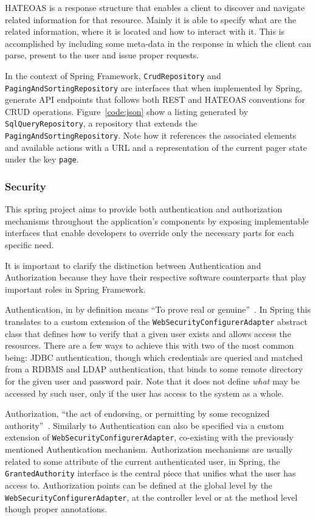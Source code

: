 \gls{HATEOAS} is a response structure that enables a client to discover and navigate related information for that resource\cite{fielding}. Mainly it is able to specify what are the related information, where it is located and how to interact with it. This is accomplished by including some meta-data in the response in which the client can parse, present to the user and issue proper requests.

In the context of Spring Framework, \texttt{CrudRepository} and \texttt{PagingAndSortingRepository} are interfaces that when implemented by Spring, generate \gls{API} endpoints that follows both \gls{REST} and \gls{HATEOAS} conventions for \gls{CRUD} operations. Figure~\ref{code:json} show a listing generated by \texttt{SqlQueryRepository}, a repository that extends the \texttt{PagingAndSortingRepository}. Note how it references the associated elements and available actions with a \gls{URL} and a representation of the current pager state under the key \texttt{page}.

\subsubsection{Security}
This spring project aims to provide both authentication and authorization mechanisms throughout the application's components by exposing implementable interfaces that enable developers to override only the necessary parts for each specific need.

It is important to clarify the distinction between Authentication and Authorization because they have their respective software counterparts that play important roles in Spring Framework.

Authentication, in by definition means ``To prove real or genuine''~\cite{merriamwebster}. In Spring this translates to a custom extension of the \texttt{WebSecurityConfigurerAdapter} abstract class that defines how to verify that a given user exists and allows access the resources. There are a few ways to achieve this with two of the most common being: \gls{JDBC} authentication, though which credentials are queried and matched from a \gls{RDBMS} and \gls{LDAP} authentication, that binds to some remote directory for the given user and password pair. Note that it does not define \textit{what} may be accessed by such user, only if the user has access to the system as a whole.

Authorization, ``the act of endorsing, or permitting by some recognized authority''~\cite{merriamwebster}. Similarly to Authentication can also be specified via a custom extension of \texttt{WebSecurityConfigurerAdapter}, co-existing with the previously mentioned Authentication mechanism. Authorization mechanisms are usually related to some attribute of the current authenticated user, in Spring, the \texttt{GrantedAuthority} interface is the central piece that unifies what the user has access to. Authorization points can be defined at the global level by the \texttt{WebSecurityConfigurerAdapter}, at the controller level or at the method level though proper annotations.

